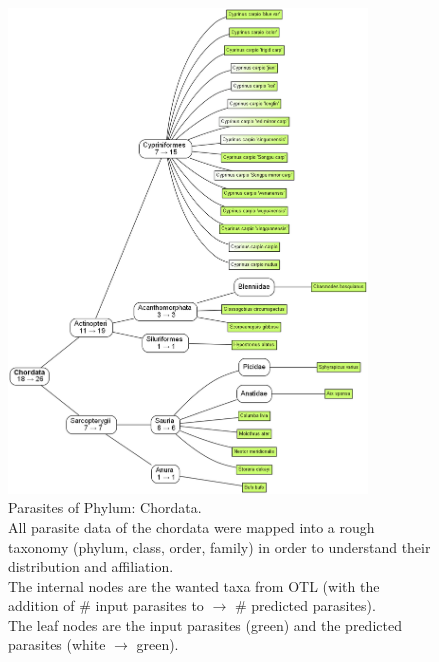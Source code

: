       \begin{figure}
        \centering
        \includegraphics[trim = 0mm 0mm 0mm 0mm, clip, width=0.85\textwidth]{Figures/ChordataParasites.png}
        \caption{Parasites of Phylum: Chordata. \\
          All parasite data of the chordata were mapped into a rough taxonomy (phylum, class, order, 
            family) in order to understand their distribution and affiliation. \\
          The internal nodes are the wanted taxa from OTL (with the addition of \# input parasites to 
            $\rightarrow$ \# predicted parasites). \\
          The leaf nodes are the input parasites (green) and the predicted parasites (white $\rightarrow$ 
            green).}
        \label{fig:ChordataParasites}
      \end{figure}

